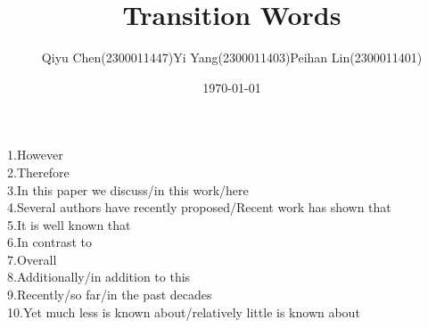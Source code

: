 \documentclass[a4paper,12pt]{article}
\title{Transition Words}
\author{Qiyu Chen(2300011447)\authorcr Yi Yang(2300011403)\authorcr Peihan Lin(2300011401)}
\date{\today}
\begin{document}
	\maketitle
	\noindent
	1.However
	\\2.Therefore
	\\3.In this paper we discuss/in this work/here
	\\4.Several authors have recently proposed/Recent work has shown that
	\\5.It is well known that
	\\6.In contrast to
	\\7.Overall
	\\8.Additionally/in addition to this
	\\9.Recently/so far/in the past decades
	\\10.Yet much less is known about/relatively little is known about
	
\end{document}
